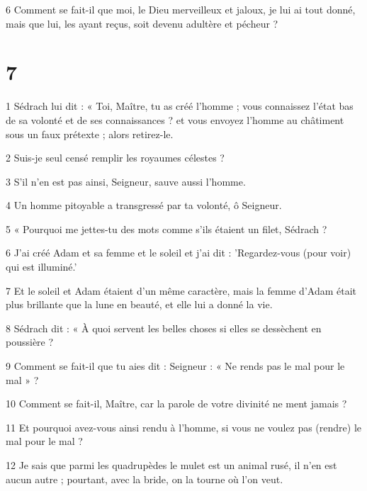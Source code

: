 \par 6 Comment se fait-il que moi, le Dieu merveilleux et jaloux, je lui ai tout donné, mais que lui, les ayant reçus, soit devenu adultère et pécheur ?

\chapter{7}

\par 1 Sédrach lui dit : « Toi, Maître, tu as créé l'homme ; vous connaissez l'état bas de sa volonté et de ses connaissances ? et vous envoyez l'homme au châtiment sous un faux prétexte ; alors retirez-le.

\par 2 Suis-je seul censé remplir les royaumes célestes ?

\par 3 S'il n'en est pas ainsi, Seigneur, sauve aussi l'homme.

\par 4 Un homme pitoyable a transgressé par ta volonté, ô Seigneur.

\par 5 « Pourquoi me jettes-tu des mots comme s'ils étaient un filet, Sédrach ?

\par 6 J'ai créé Adam et sa femme et le soleil et j'ai dit : 'Regardez-vous (pour voir) qui est illuminé.'

\par 7 Et le soleil et Adam étaient d'un même caractère, mais la femme d'Adam était plus brillante que la lune en beauté, et elle lui a donné la vie.

\par 8 Sédrach dit : « À quoi servent les belles choses si elles se dessèchent en poussière ?

\par 9 Comment se fait-il que tu aies dit : Seigneur : « Ne rends pas le mal pour le mal » ?

\par 10 Comment se fait-il, Maître, car la parole de votre divinité ne ment jamais ?

\par 11 Et pourquoi avez-vous ainsi rendu à l'homme, si vous ne voulez pas (rendre) le mal pour le mal ?

\par 12 Je sais que parmi les quadrupèdes le mulet est un animal rusé, il n'en est aucun autre ; pourtant, avec la bride, on la tourne où l'on veut.


